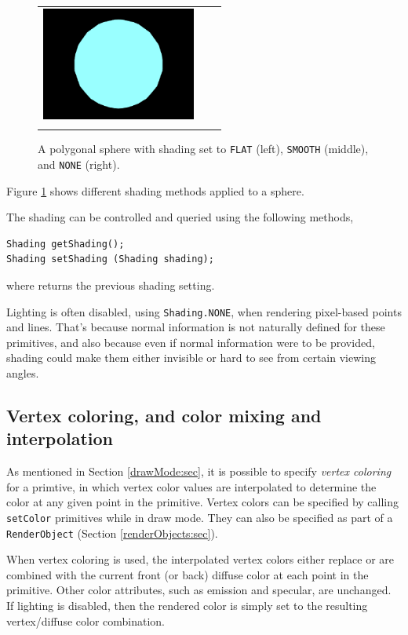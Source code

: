 \begin{figure}[ht]
\begin{center}
\begin{tabular}{ccc}
         \includegraphics[width=2in]{images/sphereNoShading}\\
      \fi
   \end{tabular}
\end{center}
\caption{A polygonal sphere with shading set to {\tt FLAT} (left),
{\tt SMOOTH} (middle), and {\tt NONE} (right).}
\label{shading:fig}
\end{figure}

Figure \ref{shading:fig} shows different shading methods applied
to a sphere.

The shading can be controlled and queried using the
following methods,
%
\begin{lstlisting}[]
Shading getShading();
Shading setShading (Shading shading);
\end{lstlisting}
%
where  returns the
previous shading setting.

Lighting is often disabled, using {\tt Shading.NONE}, when rendering
pixel-based points and lines. That's because normal information is not
naturally defined for these primitives, and also because even if
normal information were to be provided, shading could make them either
invisible or hard to see from certain viewing angles.

\subsection{Vertex coloring, and color mixing and interpolation}
\label{colorMixing:sec}

As mentioned in Section \ref{drawMode:sec}, it is possible to specify
{\it vertex coloring} for a primtive, in which vertex color values are
interpolated to determine the color at any given point in the
primitive. Vertex colors can be specified by calling {\tt setColor}
primitives while in draw mode. They can also be specified as part of a
{\tt RenderObject} (Section \ref{renderObjects:sec}).

When vertex coloring is used, the interpolated vertex colors either
replace or are combined with the current front (or back) diffuse color
at each point in the primitive. Other color attributes, such as
emission and specular, are unchanged. If lighting is disabled, then
the rendered color is simply set to the resulting vertex/diffuse color
combination.

